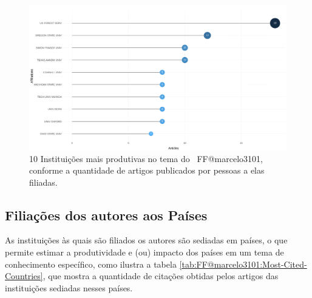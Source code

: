 \begin{figure}
    \centering
    \includegraphics[width=1\textwidth]{exploratory-data-analysis/marcelo3101/PesqBibliogr/ForestFire/WoS-20221204/assets/MostRelevantAffiliationsFFmarcelo3101.png}
    \caption{10 Instituições mais produtivas no tema do \dataset\ FF@marcelo3101, conforme a quantidade de artigos publicados por pessoas a elas filiadas.}
    \label{fig:FF@marcelo3101:Most-Relevant-Affiliations}
\end{figure}

\subsection{Filiações dos autores aos Países}

As instituições às quais são filiados os autores são sediadas em países, o que permite estimar a produtividade e (ou) impacto dos países em um tema de conhecimento específico, como ilustra a tabela \ref{tab:FF@marcelo3101:Most-Cited-Countries}, que mostra a quantidade de citações obtidas pelos artigos das instituições sediadas nesses países.

